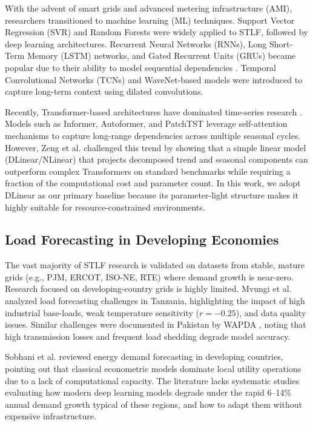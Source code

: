 \documentclass[journal]{IEEEtran}
\begin{document}
With the advent of smart grids and advanced metering infrastructure (AMI), researchers transitioned to machine learning (ML) techniques. Support Vector Regression (SVR) and Random Forests were widely applied to STLF, followed by deep learning architectures. Recurrent Neural Networks (RNNs), Long Short-Term Memory (LSTM) networks, and Gated Recurrent Units (GRUs) became popular due to their ability to model sequential dependencies \cite{khodayar2019}. Temporal Convolutional Networks (TCNs) and WaveNet-based models were introduced to capture long-term context using dilated convolutions.

Recently, Transformer-based architectures have dominated time-series research \cite{zhou2021, wu2021}. Models such as Informer, Autoformer, and PatchTST leverage self-attention mechanisms to capture long-range dependencies across multiple seasonal cycles. However, Zeng et al. \cite{zeng2023} challenged this trend by showing that a simple linear model (DLinear/NLinear) that projects decomposed trend and seasonal components can outperform complex Transformers on standard benchmarks while requiring a fraction of the computational cost and parameter count. In this work, we adopt DLinear as our primary baseline because its parameter-light structure makes it highly suitable for resource-constrained environments.

\subsection{Load Forecasting in Developing Economies}
The vast majority of STLF research is validated on datasets from stable, mature grids (e.g., PJM, ERCOT, ISO-NE, RTE) where demand growth is near-zero. Research focused on developing-country grids is highly limited. Mvungi et al. \cite{mvungi2021} analyzed load forecasting challenges in Tanzania, highlighting the impact of high industrial base-loads, weak temperature sensitivity ($r = -0.25$), and data quality issues. Similar challenges were documented in Pakistan by WAPDA \cite{wapda2020}, noting that high transmission losses and frequent load shedding degrade model accuracy. 

Sobhani et al. \cite{sobhani2020} reviewed energy demand forecasting in developing countries, pointing out that classical econometric models dominate local utility operations due to a lack of computational capacity. The literature lacks systematic studies evaluating how modern deep learning models degrade under the rapid 6--14\% annual demand growth typical of these regions, and how to adapt them without expensive infrastructure.
\end{document}
